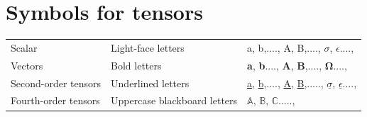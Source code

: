 \documentclass[12pt,a4paper,twoside,openright]{report}
\begin{document}
\section*{Symbols for tensors}
\begin{tabular}{l l l}
Scalar  &  Light-face letters  &  a, b,...., A, B,...., $\sigma$, $\epsilon$....,\\
Vectors &  Bold letters        &  \textbf{a}, \textbf{b}...., \textbf{A}, \textbf{B},...., $\mathbf{\Omega}$....,\\
Second-order tensors  &  Underlined letters  &  \underline{a}, \underline{b},...., \underline{A}, \underline{B},....., $\underline{\sigma}$, $\underline{\epsilon}$....,\\  
Fourth-order tensors   &  Uppercase blackboard letters  &   $\mathbb{A}$, $\mathbb{B}$, $\mathbb{C}$.....,\\
\end{tabular}
\end{document}

